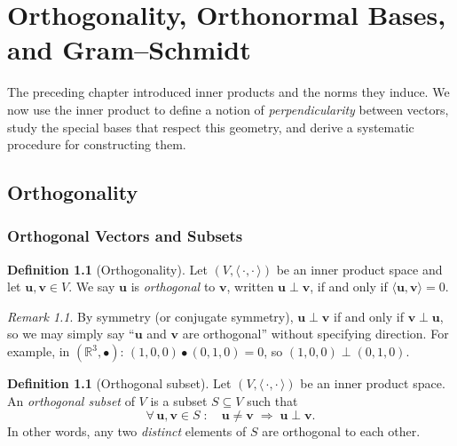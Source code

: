 \documentclass[11pt, a4paper, notitlepage]{report}
\theoremstyle{definition}
\newtheorem{definition}[theorem]{Definition}
\theoremstyle{remark}
\newtheorem{remark}[theorem]{Remark}
\begin{document}
\chapter{Orthogonality, Orthonormal Bases, and Gram--Schmidt}
\label{chap:week11}

The preceding chapter introduced inner products and the norms they induce.
We now use the inner product to define a notion of \emph{perpendicularity}
between vectors, study the special bases that respect this geometry, and
derive a systematic procedure for constructing them.

\section{Orthogonality}
\label{sec:orthogonality}

\subsection{Orthogonal Vectors and Subsets}
\label{subsec:orthogonal-vectors}

\begin{definition}[Orthogonality]
\label{def:orthogonal}
Let $(V,\langle\,\cdot,\cdot\,\rangle)$ be an inner product space and let $\mathbf{u},\mathbf{v}\in V$.
We say $\mathbf{u}$ is \emph{orthogonal} to $\mathbf{v}$, written $\mathbf{u}\perp\mathbf{v}$,
if and only if $\langle\mathbf{u},\mathbf{v}\rangle = 0$.
\end{definition}

\begin{remark}
By symmetry (or conjugate symmetry), $\mathbf{u}\perp\mathbf{v}$ if and only if
$\mathbf{v}\perp\mathbf{u}$, so we may simply say ``$\mathbf{u}$ and $\mathbf{v}$ are
orthogonal'' without specifying direction.
For example, in $(\mathbb{R}^3,\bullet)$: $(1,0,0)\bullet(0,1,0) = 0$, so
$(1,0,0)\perp(0,1,0)$.
\end{remark}

\begin{definition}[Orthogonal subset]
\label{def:orthogonal-subset}
Let $(V,\langle\,\cdot,\cdot\,\rangle)$ be an inner product space.
An \emph{orthogonal subset} of $V$ is a subset $S\subseteq V$ such that
\[
  \forall\,\mathbf{u},\mathbf{v}\in S\;:\quad
  \mathbf{u}\neq\mathbf{v} \;\Longrightarrow\; \mathbf{u}\perp\mathbf{v}.
\]
In other words, any two \emph{distinct} elements of $S$ are orthogonal to each other.
\end{definition}
\end{document}
